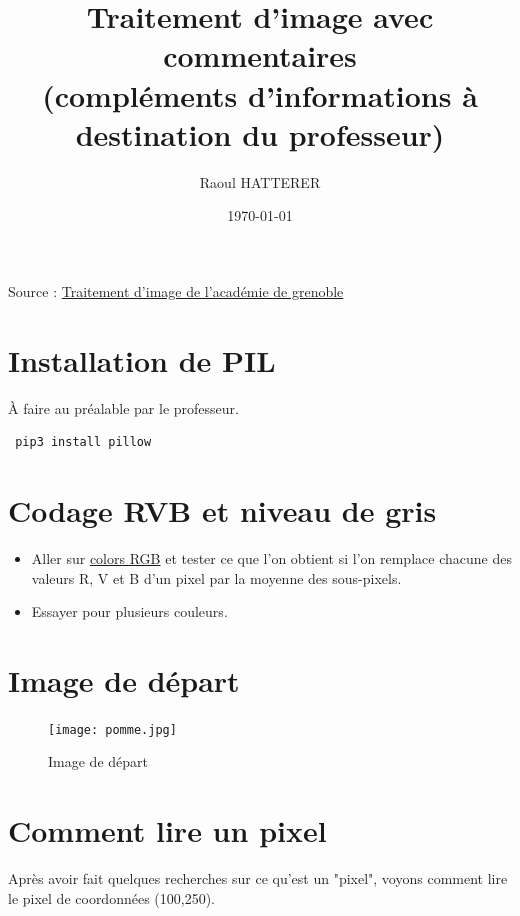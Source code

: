 \documentclass[11pt]{article}
\author{Raoul HATTERER}
\date{\today}
\title{Traitement d'image avec commentaires\\\medskip
\large (compléments d'informations à destination du professeur)}
\begin{document}
\maketitle
\tableofcontents

Source : \href{http://www.ac-grenoble.fr/disciplines/informatiquelycee/n\_site/snt\_photo\_transImg.html}{Traitement d'image de l'académie de grenoble}

\section{Installation de PIL}
\label{sec:org20ce50c}

À faire au préalable par le professeur.

\begin{verbatim}
 pip3 install pillow
\end{verbatim}



\section{Codage RVB et niveau de gris}
\label{sec:orgbb3b24c}

\begin{itemize}
\item Aller sur \href{https://www.w3schools.com/colors/colors\_rgb.asp}{colors RGB} et tester ce que l'on obtient si l'on remplace chacune des valeurs R, V et B d'un pixel par la moyenne des sous-pixels.
\item Essayer pour plusieurs couleurs.
\end{itemize}


\section{Image de départ}
\label{sec:org1fc1ed4}

\begin{figure}[htbp]
\centering
\texttt{[image: pomme.jpg]}
\caption{Image de départ}
\end{figure}


\section{Comment lire un pixel}
\label{sec:org7160ffa}

Après avoir fait quelques recherches sur ce qu'est un "pixel", voyons comment lire le pixel de coordonnées (100,250).
\end{document}

